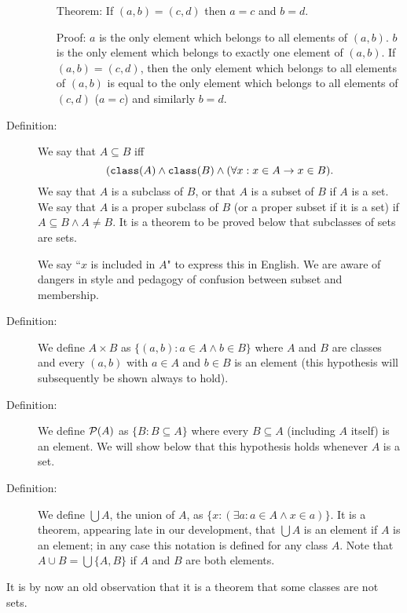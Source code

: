 \documentclass[12pt]{article}
\begin{document}
\begin{description}
\begin{enumerate}
\item[Theorem:]  If $(a,b) = (c,d)$ then $a=c$ and $b=d$.

\item[Proof:]  $a$ is the only element which belongs to all elements of $(a,b)$.  $b$ is the only element which belongs to exactly one element of $(a,b)$.
If $(a,b)=(c,d)$, then the only element which belongs to all elements of $(a,b)$ is equal to the only element which belongs to all elements of $(c,d)$ ($a=c$)
and similarly $b=d$.

\end{enumerate}

\item[Definition:]  We say that $A \subseteq B$ iff $$({\tt class}(A) \wedge {\tt class}(B) \wedge (\forall x:x \in A \rightarrow x \in B).$$  We say that $A$ is a subclass of $B$, or that
$A$ is a subset of $B$ if $A$ is a set.  We say that $A$ is a proper subclass of $B$ (or a proper subset if it is a set) if $A \subseteq B \wedge A \neq B$.  It is a theorem to be proved
below that subclasses of sets are sets.

We say ``$x$ is included in $A$" to express this in English.  We are aware of dangers in style and pedagogy of confusion between subset and membership.

\item[Definition:]  We define $A \times B$ as $\{(a,b):a \in A \wedge b \in B\}$ where $A$ and $B$ are classes and every $(a,b)$ with $a \in A$ and $b \in B$ is an element
(this hypothesis will subsequently be shown always to hold).

\item[Definition:]  We define ${\cal P}(A)$ as $\{B:B \subseteq A\}$ where every $B \subseteq A$ (including $A$ itself) is an element.  We will show below that this hypothesis holds whenever $A$ is a set.

\item[Definition:]  We define $\bigcup A$, the union of $A$, as $\{x: (\exists a:a \in A \wedge x \in a)\}$.  It is a theorem, appearing late in our development, that $\bigcup A$ is an element if $A$ is an element; in any case this notation is defined for any class $A$.  Note that $A \cup B = \bigcup \{A,B\}$ if $A$ and $B$ are both elements.

\end{description}

It is by now an old observation that it is a theorem that some classes are not sets.
\end{document}
